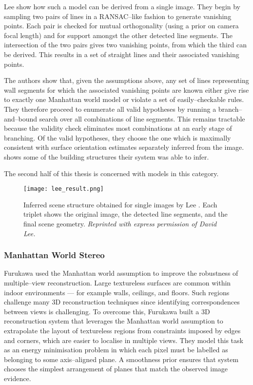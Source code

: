 Lee \etal show how such a model can be derived from a single
image. They begin by sampling two pairs of lines in a RANSAC--like
fashion to generate vanishing points. Each pair is checked for mutual
orthogonality (using a prior on camera focal length) and for support
amongst the other detected line segments. The intersection of the two
pairs gives two vanishing points, from which the third can be
derived. This results in a set of straight lines and their associated
vanishing points.

The authors show that, given the assumptions above, any set of lines
representing wall segments for which the associated vanishing points
are known either give rise to exactly one Manhattan world model or
violate a set of easily--checkable rules. They therefore proceed to
enumerate all valid hypotheses by running a branch--and--bound search
over all combinations of line segments. This remains tractable because
the validity check eliminates most combinations at an early stage of
branching. Of the valid hypotheses, they choose the one which is
maximally consistent with surface orientation estimates separately
inferred from the image.  shows some of the
building structures their system was able to infer.

The second half of this thesis is concerned with models in this
category.

\begin{figure}[tb]
  \centering
  \texttt{[image: lee\_result.png]}
  \caption{Inferred scene structure obtained for single images by Lee
    \etal \cite{Lee09}. Each triplet shows the original image, the
    detected line segments, and the final scene geometry.
    \textit{Reprinted with express permission of David Lee.}
  }
  \label{fig:lee-result}
\end{figure}

\subsubsection{Manhattan World Stereo}

Furukawa \etal \cite{Furukawa09} used the Manhattan world assumption
to improve the robustness of multiple--view reconstruction. Large
textureless surfaces are common within indoor environments --- for
example walls, ceilings, and floors. Such regions challenge many 3D
reconstruction techniques since identifying correspondences
between views is challenging. To overcome this, Furukawa \etal built a
3D reconstruction system that leverages the Manhattan world assumption
to extrapolate the layout of textureless regions from constraints
imposed by edges and corners, which are easier to localise in multiple
views. They model this task as an energy minimisation problem in which
each pixel must be labelled as belonging to some axis--aligned
plane. A smoothness prior ensures that system chooses the simplest
arrangement of planes that match the observed image evidence.

